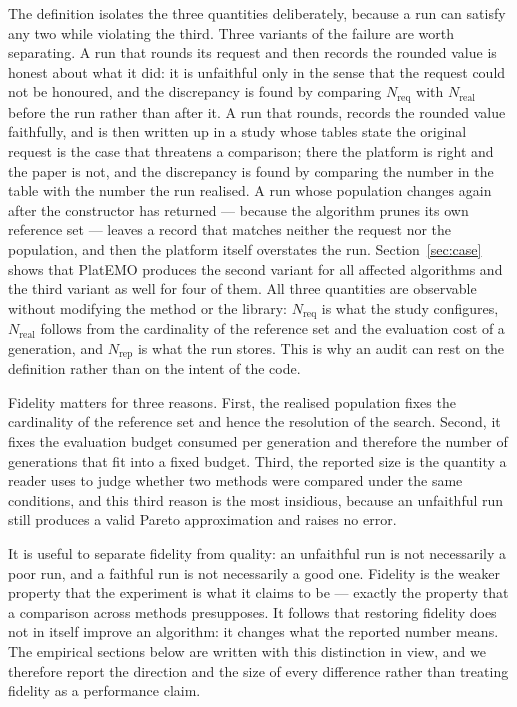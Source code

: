 \documentclass{SCIS2026}
\begin{document}
The definition isolates the three quantities deliberately, because a run can satisfy any two while violating the third. Three variants of the failure are worth separating. A run that rounds its request and then records the rounded value is honest about what it did: it is unfaithful only in the sense that the request could not be honoured, and the discrepancy is found by comparing $N_{\mathrm{req}}$ with $N_{\mathrm{real}}$ before the run rather than after it. A run that rounds, records the rounded value faithfully, and is then written up in a study whose tables state the original request is the case that threatens a comparison; there the platform is right and the paper is not, and the discrepancy is found by comparing the number in the table with the number the run realised. A run whose population changes again after the constructor has returned --- because the algorithm prunes its own reference set --- leaves a record that matches neither the request nor the population, and then the platform itself overstates the run. Section~\ref{sec:case} shows that PlatEMO produces the second variant for all affected algorithms and the third variant as well for four of them. All three quantities are observable without modifying the method or the library: $N_{\mathrm{req}}$ is what the study configures, $N_{\mathrm{real}}$ follows from the cardinality of the reference set and the evaluation cost of a generation, and $N_{\mathrm{rep}}$ is what the run stores. This is why an audit can rest on the definition rather than on the intent of the code.

Fidelity matters for three reasons. First, the realised population fixes the cardinality of the reference set and hence the resolution of the search. Second, it fixes the evaluation budget consumed per generation and therefore the number of generations that fit into a fixed budget. Third, the reported size is the quantity a reader uses to judge whether two methods were compared under the same conditions, and this third reason is the most insidious, because an unfaithful run still produces a valid Pareto approximation and raises no error.

It is useful to separate fidelity from quality: an unfaithful run is not necessarily a poor run, and a faithful run is not necessarily a good one. Fidelity is the weaker property that the experiment is what it claims to be --- exactly the property that a comparison across methods presupposes. It follows that restoring fidelity does not in itself improve an algorithm: it changes what the reported number means. The empirical sections below are written with this distinction in view, and we therefore report the direction and the size of every difference rather than treating fidelity as a performance claim.
\end{document}
